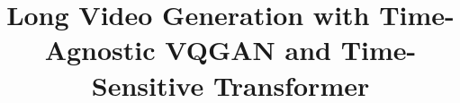 \documentclass[runningheads]{llncs}
\begin{document}
\pagestyle{headings}
\mainmatter
\def\ECCVSubNumber{5950}  %

\title{Long Video Generation with Time-Agnostic VQGAN and Time-Sensitive Transformer}

\end{document}
